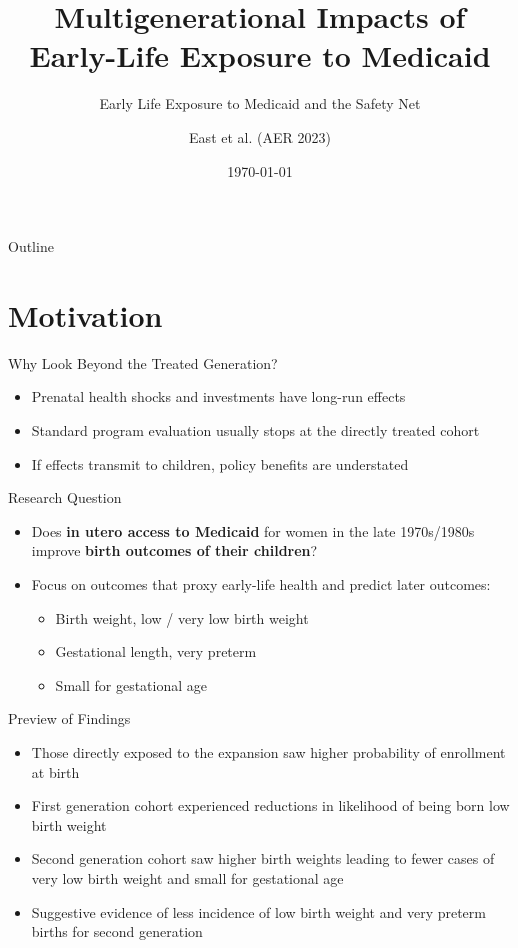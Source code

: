 \documentclass{beamer}
\title{Multigenerational Impacts of Early-Life Exposure to Medicaid}
\subtitle{Early Life Exposure to Medicaid and the Safety Net}
\author{East et al. (AER 2023)}
\institute{University of Georgia}
\date{\today}
\begin{document}
\begin{frame}
  \titlepage
\end{frame}

\begin{frame}{Outline}
  \tableofcontents
\end{frame}

\section{Motivation}

\begin{frame}{Why Look Beyond the Treated Generation?}
\begin{itemize}
  \item Prenatal health shocks and investments have long-run effects
  \item Standard program evaluation usually stops at the directly treated cohort
  \item If effects transmit to children, policy benefits are understated
\end{itemize}
\end{frame}

\begin{frame}{Research Question}
\begin{itemize}
  \item Does \textbf{in utero access to Medicaid} for women in the late 1970s/1980s improve
        \textbf{birth outcomes of their children}?
  \item Focus on outcomes that proxy early-life health and predict later outcomes:
  \begin{itemize}
    \item Birth weight, low / very low birth weight
    \item Gestational length, very preterm
    \item Small for gestational age
  \end{itemize}
\end{itemize}
\end{frame}

\begin{frame}{Preview of Findings}
  \begin{itemize}
    \item Those directly exposed to the expansion saw higher probability of enrollment at birth
    \item First generation cohort experienced reductions in likelihood of being born low birth weight
    \item Second generation cohort saw higher birth weights leading to fewer cases of very low birth weight and small for gestational age 
    \item Suggestive evidence of less incidence of low birth weight and very preterm births for second generation
  \end{itemize}
\end{frame}
\end{document}
